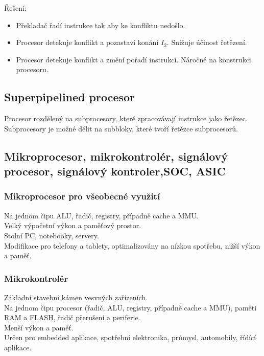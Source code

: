 Řešení:
\begin{itemize}
    \item Překladač řadí instrukce tak aby ke konfliktu nedošlo.
    \item Procesor detekuje konflikt a pozastaví konání $I_2$. Snižuje účinost řetězení.
    \item Procesor detekuje konflikt a změní pořadí instrukcí. Náročné na konstrukci procesoru.
\end{itemize}

\subsection{Superpipelined procesor}
Procesor rozdělený na subprocesory, které zpracovávají instrukce jako řetězec. \\
Subprocesory je možné dělit na subbloky, které tvoří řetězce subprocesorů. \\

\subsection{Mikroprocesor, mikrokontrolér, signálový procesor, signálový kontroler,SOC, ASIC}
\subsubsection{Mikroprocesor pro všeobecné využití}
Na jednom čipu ALU, řadič, registry, případně cache a MMU.\\
Velký výpočetní výkon a paměťový prostor.\\
Stolní PC, notebooky, servery.\\
Modifikace pro telefony a tablety, optimalizovány na nízkou spotřebu, nižší výkon a paměť. \\

\subsubsection*{Mikrokontrolér}
Základní stavební kámen vesvných zařízeních. \\
Na jednom čipu procesor (řadič, ALU, registry, případně cache a MMU), paměti RAM a FLASH, řadič přerušení a periferie.\\
Menší výkon a paměť.\\
Určen pro embedded aplikace, spotřební elektronika, průmysl, automobily, řídící aplikace. \\

